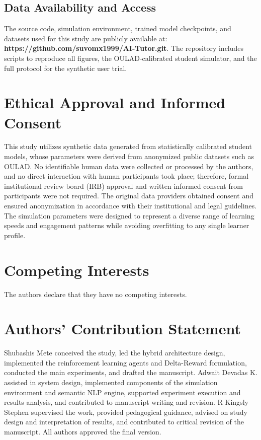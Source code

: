 \documentclass[conference]{IEEEtran}
\begin{document}
\subsection*{Data Availability and Access}
The source code, simulation environment, trained model checkpoints, and datasets used for this study are publicly available at: \textbf{https://github.com/suvomx1999/AI-Tutor.git}. The repository includes scripts to reproduce all figures, the OULAD-calibrated student simulator, and the full protocol for the synthetic user trial.

\section*{Ethical Approval and Informed Consent}
This study utilizes synthetic data generated from statistically calibrated student models, whose parameters were derived from anonymized public datasets such as OULAD. No identifiable human data were collected or processed by the authors, and no direct interaction with human participants took place; therefore, formal institutional review board (IRB) approval and written informed consent from participants were not required. The original data providers obtained consent and ensured anonymization in accordance with their institutional and legal guidelines. The simulation parameters were designed to represent a diverse range of learning speeds and engagement patterns while avoiding overfitting to any single learner profile.

\section*{Competing Interests}
The authors declare that they have no competing interests.

\section*{Authors' Contribution Statement}
Shubashis Mete conceived the study, led the hybrid architecture design, implemented the reinforcement learning agents and Delta-Reward formulation, conducted the main experiments, and drafted the manuscript. Adwait Devadas K. assisted in system design, implemented components of the simulation environment and semantic NLP engine, supported experiment execution and results analysis, and contributed to manuscript writing and revision. R Kingsly Stephen supervised the work, provided pedagogical guidance, advised on study design and interpretation of results, and contributed to critical revision of the manuscript. All authors approved the final version.
\end{document}
